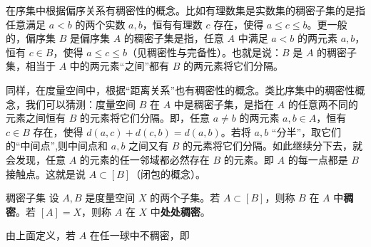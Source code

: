 
在序集中根据偏序关系有稠密性的概念。比如有理数集是实数集的稠密子集的是指任意满足 $a<b$ 的两个实数 $a,b$，恒有有理数 $c$ 存在，使得 $a\leq c\leq b$。更一般的，偏序集 $B$ 是偏序集 $A$ 的稠密子集是指，任意 $A$ 中满足 $a<b$ 的两元素 $a,b$，恒有 $c\in B$，使得 $a\leq c\leq b$（见稠密性与完备性）。也就是说：$B$ 是 $A$ 的稠密子集，相当于 $A$ 中的两元素“之间”都有 $B$ 的两元素将它们分隔。

同样，在度量空间中，根据“距离关系”也有稠密性的概念。类比序集中的稠密性概念，我们可以猜测：度量空间 $B$ 在 $A$ 中是稠密子集，是指在 $A$ 的任意两不同的元素之间恒有 $B$ 的元素将它们分隔。即，任意 $a\neq b$ 的两元素 $a,b\in A$，恒有 $c\in B$ 存在，使得 $d(a,c)+d(c,b)=d(a,b)$。若将 $a,b$ “分半”，取它们的“中间点”,则中间点和 $a,b$ 之间又有 $B$ 的元素将它们分隔。如此继续分下去，就会发现，任意 $A$ 的元素的任一邻域都必然存在 $B$ 的元素。即 $A$ 的每一点都是 $B$ 接触点。这就是说 $A\subset [B]$（闭包的概念）。

\begin{definition}{稠密子集}
设 $A,B$ 是度量空间 $X$ 的两个子集。若 $A\subset [B]$，则称 $B$ 在 $A$ 中\textbf{稠密}。若 $[A]=X$，则称 $A$ 在 $X$ 中\textbf{处处稠密}。
\end{definition}

由上面定义，若 $A$ 在任一球中不稠密，即